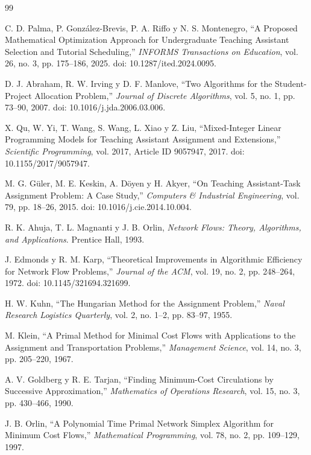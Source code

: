 \documentclass{article}
\begin{document}
\begin{thebibliography}{99}

C. D. Palma, P. González-Brevis, P. A. Riffo y N. S. Montenegro,
``A Proposed Mathematical Optimization Approach for Undergraduate
Teaching Assistant Selection and Tutorial Scheduling,''
\textit{INFORMS Transactions on Education},
vol. 26, no. 3, pp. 175--186, 2025.
doi: 10.1287/ited.2024.0095.

D. J. Abraham, R. W. Irving y D. F. Manlove,
``Two Algorithms for the Student-Project Allocation Problem,''
\textit{Journal of Discrete Algorithms},
vol. 5, no. 1, pp. 73--90, 2007.
doi: 10.1016/j.jda.2006.03.006.

X. Qu, W. Yi, T. Wang, S. Wang, L. Xiao y Z. Liu,
``Mixed-Integer Linear Programming Models for Teaching Assistant
Assignment and Extensions,''
\textit{Scientific Programming},
vol. 2017, Article ID 9057947, 2017.
doi: 10.1155/2017/9057947.

M. G. Güler, M. E. Keskin, A. Döyen y H. Akyer,
``On Teaching Assistant-Task Assignment Problem: A Case Study,''
\textit{Computers \& Industrial Engineering},
vol. 79, pp. 18--26, 2015.
doi: 10.1016/j.cie.2014.10.004.

R. K. Ahuja, T. L. Magnanti y J. B. Orlin,
\textit{Network Flows: Theory, Algorithms, and Applications}.
Prentice Hall, 1993.

J. Edmonds y R. M. Karp,
``Theoretical Improvements in Algorithmic Efficiency for Network Flow Problems,''
\textit{Journal of the ACM},
vol. 19, no. 2, pp. 248--264, 1972.
doi: 10.1145/321694.321699.

H. W. Kuhn,
``The Hungarian Method for the Assignment Problem,''
\textit{Naval Research Logistics Quarterly},
vol. 2, no. 1--2, pp. 83--97, 1955.

M. Klein,
``A Primal Method for Minimal Cost Flows with Applications to the Assignment and Transportation Problems,''
\textit{Management Science},
vol. 14, no. 3, pp. 205--220, 1967.

A. V. Goldberg y R. E. Tarjan,
``Finding Minimum-Cost Circulations by Successive Approximation,''
\textit{Mathematics of Operations Research},
vol. 15, no. 3, pp. 430--466, 1990.

J. B. Orlin,
``A Polynomial Time Primal Network Simplex Algorithm for Minimum Cost Flows,''
\textit{Mathematical Programming},
vol. 78, no. 2, pp. 109--129, 1997.


\end{thebibliography}
\end{document}
